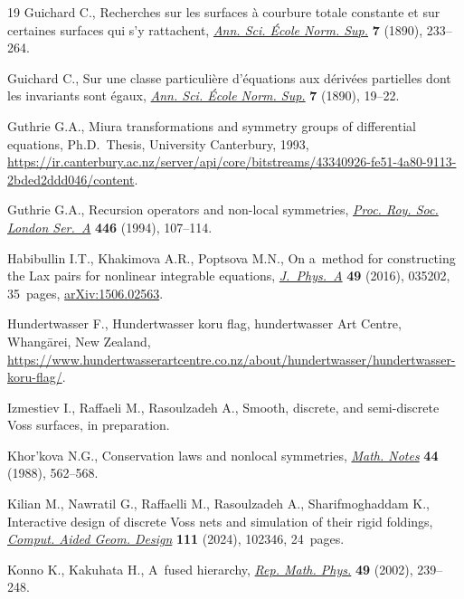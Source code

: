 \documentclass[pdftex]{sigma}
\numberwithin{equation}{section}
\theoremstyle{definition}
\begin{document}
\begin{thebibliography}{19}
Guichard C., Recherches sur les surfaces \`a courbure totale constante et sur
 certaines surfaces qui s'y rattachent, \href{https://www.numdam.org/item/10.24033/asens.333.pdf}{\textit{Ann. Sci. \'Ecole Norm. Sup.}} \textbf{7} (1890), 233--264.

Guichard C., Sur une classe particuli\`ere d'\'equations aux d\'eriv\'ees
 partielles dont les invariants sont \'egaux, \href{https://www.numdam.org/item/10.24033/asens.333.pdf}{\textit{Ann. Sci. \'Ecole Norm. Sup.}} \textbf{7} (1890), 19--22.

Guthrie G.A., Miura transformations and symmetry groups of differential
 equations, Ph.D.~Thesis, {U}niversity Canterbury, 1993,
 \url{https://ir.canterbury.ac.nz/server/api/core/bitstreams/43340926-fe51-4a80-9113-2bded2ddd046/content}.

Guthrie G.A., Recursion operators and non-local symmetries,
 \href{https://doi.org/10.1098/rspa.1994.0094}{\textit{Proc. Roy. Soc. London
 Ser.~A}} \textbf{446} (1994), 107--114.

Habibullin I.T., Khakimova A.R., Poptsova M.N., On a~method for constructing
 the {L}ax pairs for nonlinear integrable equations,
 \href{https://doi.org/10.1088/1751-8113/49/3/035202}{\textit{J.~Phys.~A}}
 \textbf{49} (2016), 035202, 35~pages,
 \href{http://arxiv.org/abs/1506.02563}{arXiv:1506.02563}.

Hundertwasser F., Hundertwasser koru flag, hundertwasser Art Centre,
 Whang\=arei, New Zealand,
 \url{https://www.hundertwasserartcentre.co.nz/about/hundertwasser/hundertwasser-koru-flag/}.

Izmestiev I., Raffaeli M., Rasoulzadeh A., Smooth, discrete, and semi-discrete
 {V}oss surfaces, {i}n preparation.

Khor'kova N.G., Conservation laws and nonlocal symmetries,
 \href{https://doi.org/10.1007/BF01158125}{\textit{Math. Notes}} \textbf{44}
 (1988), 562--568.

Kilian M., Nawratil G., Raffaelli M., Rasoulzadeh A., Sharifmoghaddam K.,
 Interactive design of discrete {V}oss nets and simulation of their rigid
 foldings, \href{https://doi.org/10.1016/j.cagd.2024.102346}{\textit{Comput.
 Aided Geom. Design}} \textbf{111} (2024), 102346, 24~pages.

Konno K., Kakuhata H., A~fused hierarchy,
 \href{https://doi.org/10.1016/S0034-4877(02)80022-2}{\textit{Rep. Math.
 Phys.}} \textbf{49} (2002), 239--248.


\end{thebibliography}
\end{document}
